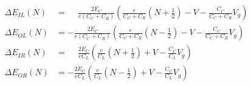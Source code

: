 \documentclass[../main.tex]{subfiles}
\begin{document}
\begin{align*}
    \Delta E_{IL}(N) &= \phantom{-}\frac{2E_{C}}{e(C_{C} + C_{R})}\left(\frac{e}{C_{C} + C_{R}}\left(N + \frac{1}{2}\right) - V - \frac{C_{C}}{C_{C} + C_{R}}V_{g}\right)\\
    \Delta E_{OL}(N) &= -\frac{2E_{C}}{e(C_{C} + C_{R})}\left(\frac{e}{C_{C} + C_{R}}\left(N - \frac{1}{2}\right) - V - \frac{C_{C}}{C_{C} + C_{R}}V_{g}\right)\\
    \Delta E_{IR}(N) &= \phantom{-}\frac{2E_{C}}{eC_{L}}               \left(\frac{e}{C_{L}}\left(N + \frac{1}{2}\right) + V - \frac{C_{C}}{C_{L}}V_{g}\right)\\
    \Delta E_{OR}(N) &= -\frac{2E_{C}}{eC_{L}}               \left(\frac{e}{C_{L}}\left(N - \frac{1}{2}\right) + V - \frac{C_{C}}{C_{L}}V_{g}\right)
\end{align*}
\end{document}
